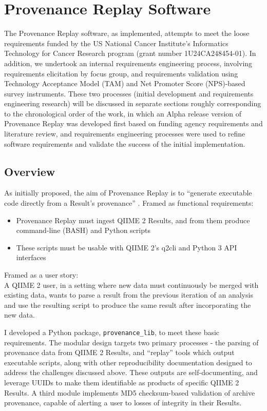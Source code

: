 \chapter{Provenance Replay Software}
The Provenance Replay software, as implemented, attempts to meet the loose
requirements funded by the US National Cancer Institute’s Informatics Technology
for Cancer Research program (grant number 1U24CA248454-01). In addition, we
undertook an internal requirements engineering process, involving requirements
elicitation by focus group, and requirements validation using Technology
Acceptance Model (TAM) \parencite{davis_perceived_1989} and Net Promoter Score
\parencite{reichheld_one_2003} (NPS)-based survey instruments. These two
processes (initial development and requirements engineering research) will be
discussed in separate sections roughly corresponding to the chronological order
of the work, in which an Alpha release version of Provenance Replay was
developed first based on funding agency requirements and literature review, and
requirements engineering processes were used to refine software requirements and
validate the success of the initial implementation.

\section{Overview}

As initially proposed, the aim of Provenance Replay is to “generate executable
code directly from a Result’s provenance” \parencite{caporaso_nci_2022}.
Framed as functional requirements:
\begin{itemize}
    \item Provenance Replay must ingest QIIME 2 Results, and from them produce
        command-line (BASH) and Python scripts
    \item These scripts must be usable with QIIME 2’s q2cli and Python 3 API interfaces
\end{itemize}

\noindent Framed as a user story: \\
A QIIME 2 user, in a setting where new data must continuously be
merged with existing data, wants to parse a result from the previous iteration
of an analysis and use the resulting script to produce the same result after
incorporating the new data. 

I developed a Python package, \texttt{provenance\_lib}, to meet these basic
requirements.  The modular design targets two primary processes - the parsing of
provenance data from QIIME 2 Results, and “replay” tools which output executable
scripts, along with other reproducibility documentation designed to address the
challenges discussed above. These outputs are self-documenting, and leverage
UUIDs to make them identifiable as products of specific QIIME 2 Results. A third
module implements MD5 checksum-based validation of archive provenance, capable
of alerting a user to losses of integrity in their Results. 

